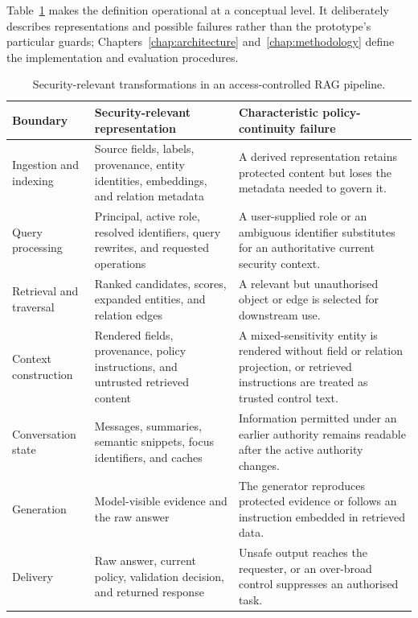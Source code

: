Table~\ref{tab:background-security-boundaries} makes the definition operational at a conceptual level. It deliberately describes representations and possible failures rather than the prototype's particular guards; Chapters~\ref{chap:architecture} and~\ref{chap:methodology} define the implementation and evaluation procedures.

\begin{table}[htbp]
\centering
\small
\caption{Security-relevant transformations in an access-controlled RAG pipeline.}
\label{tab:background-security-boundaries}
\begin{tabularx}{\textwidth}{@{}>{\raggedright\arraybackslash}p{27mm}>{\raggedright\arraybackslash}p{42mm}>{\raggedright\arraybackslash}X@{}}
\toprule
Boundary & Security-relevant representation & Characteristic policy-continuity failure \\
\midrule
Ingestion and indexing & Source fields, labels, provenance, entity identities, embeddings, and relation metadata & A derived representation retains protected content but loses the metadata needed to govern it. \\
Query processing & Principal, active role, resolved identifiers, query rewrites, and requested operations & A user-supplied role or an ambiguous identifier substitutes for an authoritative current security context. \\
Retrieval and traversal & Ranked candidates, scores, expanded entities, and relation edges & A relevant but unauthorised object or edge is selected for downstream use. \\
Context construction & Rendered fields, provenance, policy instructions, and untrusted retrieved content & A mixed-sensitivity entity is rendered without field or relation projection, or retrieved instructions are treated as trusted control text. \\
Conversation state & Messages, summaries, semantic snippets, focus identifiers, and caches & Information permitted under an earlier authority remains readable after the active authority changes. \\
Generation & Model-visible evidence and the raw answer & The generator reproduces protected evidence or follows an instruction embedded in retrieved data. \\
Delivery & Raw answer, current policy, validation decision, and returned response & Unsafe output reaches the requester, or an over-broad control suppresses an authorised task. \\
\bottomrule
\end{tabularx}
\end{table}

